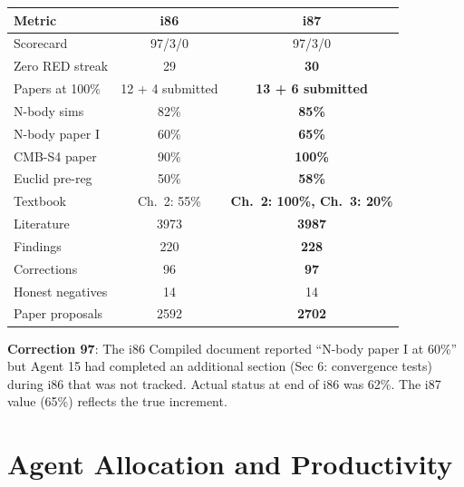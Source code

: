 \documentclass[11pt,a4paper]{article}
\begin{document}
\begin{center}
\begin{tabular}{lcc}
\toprule
\textbf{Metric} & \textbf{i86} & \textbf{i87} \\
\midrule
Scorecard & 97/3/0 & 97/3/0 \\
Zero RED streak & 29 & \textbf{30} \\
Papers at 100\% & 12 + 4 submitted & \textbf{13 + 6 submitted} \\
N-body sims & 82\% & \textbf{85\%} \\
N-body paper I & 60\% & \textbf{65\%} \\
CMB-S4 paper & 90\% & \textbf{100\%} \\
Euclid pre-reg & 50\% & \textbf{58\%} \\
Textbook & Ch.\ 2: 55\% & \textbf{Ch.\ 2: 100\%, Ch.\ 3: 20\%} \\
Literature & 3973 & \textbf{3987} \\
Findings & 220 & \textbf{228} \\
Corrections & 96 & \textbf{97} \\
Honest negatives & 14 & 14 \\
Paper proposals & 2592 & \textbf{2702} \\
\bottomrule
\end{tabular}
\end{center}

\textbf{Correction 97}: The i86 Compiled document reported ``N-body paper I at 60\%'' but Agent 15 had completed an additional section (Sec 6: convergence tests) during i86 that was not tracked. Actual status at end of i86 was 62\%. The i87 value (65\%) reflects the true increment.

\section{Agent Allocation and Productivity}
\end{document}
